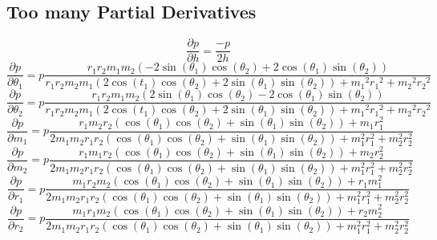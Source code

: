 \documentclass[11pt]{article}
\begin{document}
\subsection{Too many Partial Derivatives}
\begin{equation}
\frac{\partial p}{ \partial h} = \frac{-p}{2 h} \label{eq:4}
\end{equation}
\begin{equation}
\frac{\partial p}{ \partial \theta_1} = p \frac { {r_1} {r_2} {m_1} {m_2} \left( -2 \sin \left( \theta_1 \right) \cos \left( \theta_2 \right) +2 \cos \left( \theta_1 \right) \sin \left( \theta_2 \right)  \right) }{{r_1} {r_2} {m_2} { m_1} \left( 2 \cos \left( {t_1} \right) \cos \left( \theta_2 \right) +2 \sin \left( {\theta_1} \right) \sin \left( {\theta_2}\right)  \right)+{{m_1}}^{2}{{r_1}}^{2}+{{ m_2}}^{2}{{r_2}}^{2}}
\end{equation}
\begin{equation}
\frac{\partial p}{ \partial \theta_2} = p \frac { {r_1} {r_2} {m_1} {m_2} \left( 2 \sin \left( \theta_1 \right) \cos \left( \theta_2 \right) -2 \cos \left( \theta_1 \right) \sin \left( \theta_2 \right)  \right) }{{r_1} {r_2} {m_2} { m_1} \left( 2 \cos \left( {t_1} \right) \cos \left( \theta_2 \right) +2 \sin \left( {\theta_1} \right) \sin \left( {\theta_2}\right)  \right)+{{m_1}}^{2}{{r_1}}^{2}+{{ m_2}}^{2}{{r_2}}^{2}}
\end{equation}
\begin{equation}
\frac{\partial p}{ \partial m_1} = p \frac {r_1 m_2 r_2 \left(\cos(\theta_1)\cos(\theta_2) + \sin(\theta_1)\sin(\theta_2) \right) + m_1 r_1^2}{2 m_1 m_2 r_1 r_2 \left(\cos(\theta_1)\cos(\theta_2) + \sin(\theta_1)\sin(\theta_2) \right) + m_1^2 r_1^2 + m_2^2 r_2^2}
\end{equation}
\begin{equation}
\frac{\partial p}{ \partial m_2} = p \frac {r_1 m_1 r_2 \left(\cos(\theta_1)\cos(\theta_2) + \sin(\theta_1)\sin(\theta_2) \right) + m_2 r_2^2}{2 m_1 m_2 r_1 r_2 \left(\cos(\theta_1)\cos(\theta_2) + \sin(\theta_1)\sin(\theta_2) \right) + m_1^2 r_1^2 + m_2^2 r_2^2}
\end{equation}
\begin{equation}
\frac{\partial p}{ \partial r_1} = p \frac {m_1 r_2 m_2 \left(\cos(\theta_1)\cos(\theta_2) + \sin(\theta_1)\sin(\theta_2) \right) + r_1 m_1^2}{2 m_1 m_2 r_1 r_2 \left(\cos(\theta_1)\cos(\theta_2) + \sin(\theta_1)\sin(\theta_2) \right) + m_1^2 r_1^2 + m_2^2 r_2^2}
\end{equation}
\begin{equation}
\frac{\partial p}{ \partial r_2} = p \frac {m_1 r_1 m_2 \left(\cos(\theta_1)\cos(\theta_2) + \sin(\theta_1)\sin(\theta_2) \right) + r_2 m_2^2}{2 m_1 m_2 r_1 r_2 \left(\cos(\theta_1)\cos(\theta_2) + \sin(\theta_1)\sin(\theta_2) \right) + m_1^2 r_1^2 + m_2^2 r_2^2}
\label{eq:5}
\end{equation}
\end{document}
